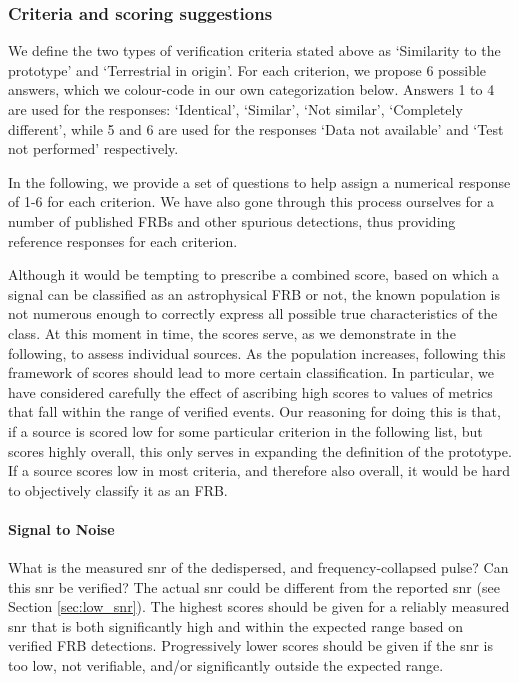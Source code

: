 \documentclass[a4paper,fleqn,usenatbib]{mnras}
\begin{document}
\subsubsection{Criteria and scoring suggestions}

We define the two types of verification criteria stated above as `Similarity to
the prototype' and `Terrestrial in origin'. For each criterion, we propose 6
possible answers, which we colour-code in our own categorization below. Answers
1 to 4 are used for the responses: `Identical', `Similar', `Not similar',
`Completely different', while 5 and 6 are used for the responses `Data not
available' and `Test not performed' respectively.

In the following, we provide a set of questions to help assign a numerical
response of 1-6 for each criterion. We have also gone through this process
ourselves for a number of published FRBs and other spurious detections, thus
providing reference responses for each criterion.

Although it would be tempting to prescribe a combined score, based on which a
signal can be classified as an astrophysical FRB or not, the known population is
not numerous enough to correctly express all possible true characteristics of
the class. At this moment in time, the scores serve, as we demonstrate in the
following, to assess individual sources. As the population increases, following
this framework of scores should lead to more certain classification. In
particular, we have considered carefully the effect of ascribing high scores to
values of metrics that fall within the range of verified events. Our reasoning
for doing this is that, if a source is scored low for some particular criterion
in the following list, but scores highly overall, this only serves in expanding
the definition of the prototype. If a source scores low in most criteria, and
therefore also overall, it would be hard to objectively classify it as an FRB.

\paragraph{Signal to Noise}

What is the measured \gls{snr} of the dedispersed, and frequency-collapsed
pulse? Can this \gls{snr} be verified? The actual \gls{snr} could be different
from the reported \gls{snr} (see Section \ref{sec:low_snr}). The highest scores
should be given for a reliably measured \gls{snr} that is both significantly
high and within the expected range based on verified FRB detections.
Progressively lower scores should be given if the \gls{snr} is too low, not
verifiable, and/or significantly outside the expected range.
\end{document}
